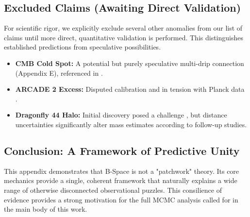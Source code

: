 \documentclass{BSpacePaper} %
\begin{document}
\begin{appendices}
\subsection{Excluded Claims (Awaiting Direct Validation)}
For scientific rigor, we explicitly exclude several other anomalies from our list of claims until more direct, quantitative validation is performed. This distinguishes established predictions from speculative possibilities.
\begin{itemize}
    \item \textbf{CMB Cold Spot:} A potential but purely speculative multi-drip connection (Appendix E), referenced in \citet{Naidoo2016}.
    \item \textbf{ARCADE 2 Excess:} Disputed calibration and in tension with Planck data \citep{Fixsen2011}.
    \item \textbf{Dragonfly 44 Halo:} Initial discovery posed a challenge \citep{vanDokkum2016}, but distance uncertainties significantly alter mass estimates according to follow-up studies.
\end{itemize}

\subsection{Conclusion: A Framework of Predictive Unity}
This appendix demonstrates that B-Space is not a "patchwork" theory. Its core mechanics provide a single, coherent framework that naturally explains a wide range of otherwise disconnected observational puzzles. This consilience of evidence provides a strong motivation for the full MCMC analysis called for in the main body of this work.

\end{appendices}
\end{document}
